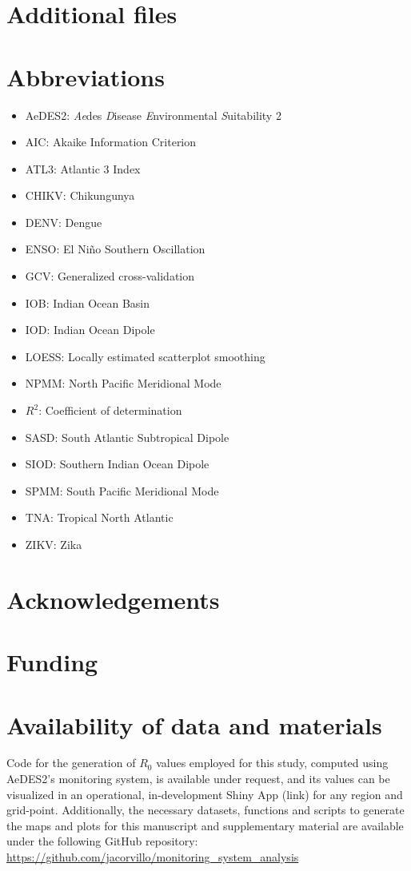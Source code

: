 \documentclass[article,10pt,twocolumn]{wlscirep}
\begin{document}
\section{Additional files} \label{sec-additional-files}

\section{Abbreviations} \label{sec-abbreviations}
\begin{itemize}
  \item AeDES2: \textit{Ae}des \textit{D}isease \textit{E}nvironmental \textit{S}uitability 2
  \item AIC: Akaike Information Criterion
  \item ATL3: Atlantic 3 Index
  \item CHIKV: Chikungunya
  \item DENV: Dengue
  \item ENSO: El Niño Southern Oscillation
  \item GCV: Generalized cross-validation
  \item IOB: Indian Ocean Basin
  \item IOD: Indian Ocean Dipole
  \item LOESS: Locally estimated scatterplot smoothing
  \item NPMM: North Pacific Meridional Mode
  \item $R^2$: Coefficient of determination
  \item SASD: South Atlantic Subtropical Dipole
  \item SIOD: Southern Indian Ocean Dipole
  \item SPMM: South Pacific Meridional Mode
  \item TNA: Tropical North Atlantic
  \item ZIKV: Zika
\end{itemize}

\section{Acknowledgements} \label{sec-acknowledgements}

\section{Funding} \label{sec-funding}

\section{Availability of data and materials} \label{sec-availability}
Code for the generation of $R_0$ values employed for this study, computed using AeDES2's monitoring system, is available under request, and its values can be visualized in an operational, in-development Shiny App (link) for any region and grid-point. Additionally, the necessary datasets, functions and scripts to generate the maps and plots for this manuscript and supplementary material are available under the following GitHub repository: \url{https://github.com/jacorvillo/monitoring_system_analysis}
\end{document}
